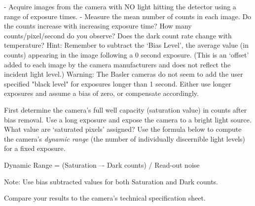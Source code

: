\documentclass[a4paper]{report}
\newcommand{\nexercise}[0]{\arabic{exercises}\addtocounter{exercises}{1}}
\begin{document}
\begin{exercisebox}[frametitle={Exercise \nexercise: Measure dark counts}]
\begin{flushleft}
- Acquire images from the camera with NO light hitting the detector using a range of exposure times.
\linebreak
- Measure the mean number of counts in each image. Do the counts increase with increasing exposure time? How many counts/pixel/second do you observe? Does the dark count rate change with temperature?
\linebreak
\linebreak
Hint: Remember to subtract the ‘Bias Level’, the average value (in counts) appearing in the image following a 0 second exposure. (This is an ‘offset’ added to each image by the camera manufacturers and does not reflect the incident light level.) 
\linebreak
\linebreak
Warning: The Basler cameras do not seem to add the user specified "black level" for exposures longer than 1 second. Either use longer exposures and assume a bias of zero, or compensate accordingly. 
\end{flushleft}
\end{exercisebox}

\begin{exercisebox}[frametitle={Exercise \nexercise: Compute the dynamic range of the camera}]
First determine the camera’s full well capacity (saturation value) in counts after bias removal. 
Use a long exposure and expose the camera to a bright light source. What value are ‘saturated pixels’ assigned? 
Use the formula below to compute the camera’s \textit{dynamic range} (the number of individually discernible light levels) for a fixed exposure. 
\begin{center}
Dynamic Range = (Saturation –- Dark counts) / Read-out noise
\end{center}

Note: Use bias subtracted values for both Saturation and Dark counts.

Compare your results to the camera’s technical specification sheet. 
\end{exercisebox}
\end{document}

